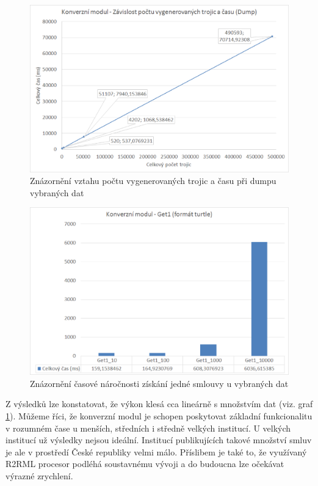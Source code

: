 \begin{figure}[H]
\centerline{\includegraphics[width=\textwidth]{img/graphDump2.eps}}
\caption{Znázornění vztahu počtu vygenerovaných trojic a času při dumpu vybraných dat}
\label{obr:graphDump2}
\end{figure}

\begin{figure}[H]
\centerline{\includegraphics[width=\textwidth]{img/graphGet1.eps}}
\caption{Znázornění časové náročnosti získání jedné smlouvy u vybraných dat}
\label{obr:graphGet1}
\end{figure}

\newpage
Z výsledků lze konstatovat, že výkon klesá cca lineárně s množstvím dat (viz. graf \ref{obr:graphDump2}). Můžeme říci, že konverzní modul je schopen poskytovat základní funkcionalitu v rozumném čase u menších, středních i středně velkých institucí. U velkých institucí už výsledky nejsou ideální. Institucí publikujících takové množství smluv je ale v prostředí České republiky velmi málo. Příslibem je také to, že využívaný R2RML procesor podléhá soustavnému vývoji a do budoucna lze očekávat výrazné zrychlení.
